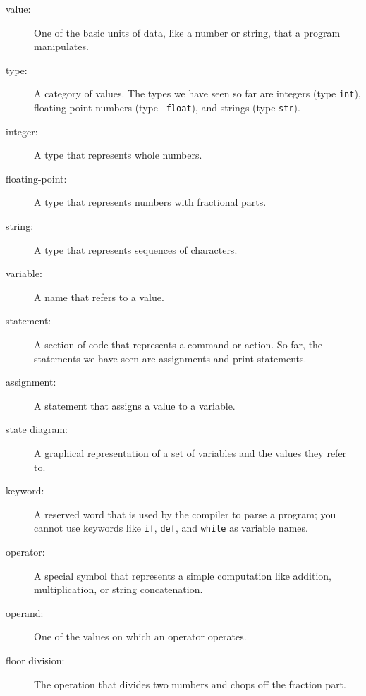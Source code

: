 \documentclass[10pt]{book}
\begin{document}
\begin{description}

\item[value:]  One of the basic units of data, like a number or string, 
that a program manipulates.

\item[type:] A category of values.  The types we have seen so far
are integers (type {\tt int}), floating-point numbers (type {\tt
float}), and strings (type {\tt str}).

\item[integer:] A type that represents whole numbers.

\item[floating-point:] A type that represents numbers with fractional
parts.

\item[string:] A type that represents sequences of characters.

\item[variable:]  A name that refers to a value.

\item[statement:]  A section of code that represents a command or action.  So
far, the statements we have seen are assignments and print statements.

\item[assignment:]  A statement that assigns a value to a variable.

\item[state diagram:]  A graphical representation of a set of variables and the
values they refer to.

\item[keyword:]  A reserved word that is used by the compiler to parse a
program; you cannot use keywords like {\tt if}, {\tt  def}, and {\tt while} as
variable names.

\item[operator:]  A special symbol that represents a simple computation like
addition, multiplication, or string concatenation.

\item[operand:]  One of the values on which an operator operates.

\item[floor division:] The operation that divides two numbers and chops off
the fraction part.


\end{description}
\end{document}
